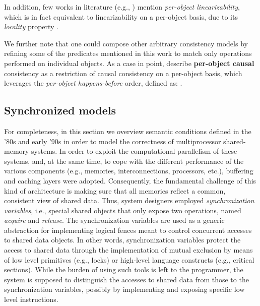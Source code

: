 \documentclass[letter, 11pt]{article}
\newcommand{\citeN}{\citet}
\renewcommand{\cite}{\citep}
\begin{document}
In addition, few works in literature (e.g., \cite{Moraru.ea:13}) mention \emph{per-object linearizability},
which is in fact equivalent to linearizability on a per-object basis,
due to its \emph{locality} property \cite{Herlihy.Wing:90}.

We further note that one could compose other arbitrary consistency models by refining some of the
predicates mentioned in this work to match only operations performed on individual objects.
As a case in point, \citeN{Burckhardt.Gotsman.ea:14} 
describe \textbf{per-object causal} consistency as a restriction of causal consistency on a per-object basis,
which leverages the \emph{per-object happens-before} order, defined as: .




\subsection{Synchronized models}
\label{subsec:sync}
For completeness, in this section we overview semantic conditions defined in the '80s 
and early '90s in order to model the correctness of multiprocessor shared-memory systems.
In order to exploit the computational parallelism of these systems, and, at the 
same time, to cope with the different performance of the various components 
(e.g., memories, interconnections, processors, etc.), buffering and caching layers were adopted.
Consequently, the fundamental challenge of this kind of architecture is making sure that 
all memories reflect a common, consistent view of shared data.
Thus, system designers employed \emph{synchronization variables}, i.e.,
special shared objects that only expose two operations, named \emph{acquire} and \emph{release}.
The synchronization variables are used as a generic abstraction for implementing logical fences
meant to control concurrent accesses to shared data objects.
In other words, synchronization variables protect the access to shared data 
through the implementation of mutual exclusion by means of low level primitives 
(e.g., locks) or high-level language constructs (e.g., critical sections).
While the burden of using such tools is left to the programmer, 
the system is supposed to distinguish the accesses to shared data from those to 
the synchronization variables, possibly by implementing and exposing specific low level instructions.
\end{document}
